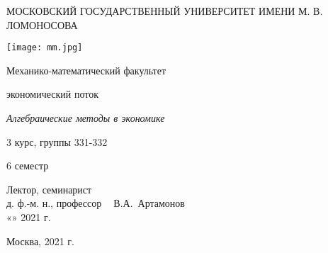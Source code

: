 \begin{titlepage}
  \begin{center}
    \large
 
 	МОСКОВСКИЙ ГОСУДАРСТВЕННЫЙ УНИВЕРСИТЕТ ИМЕНИ М. В. ЛОМОНОСОВА 
    
    \texttt{[image: mm.jpg]} 
     
    Механико-математический факультет
    \vspace{0.25cm} 
      
    экономический поток
    \vspace{0.8cm} 
     
    {\LARGE \textit{Алгебраические методы в экономике}}
    
    \vspace{0.8cm} 
    3 курс, группы 331-332

    \vspace{0.25cm} 
    6 семестр
\end{center}
\vfill
 
\newlength{\ML}
\hfill\begin{minipage}{7cm}
  \begin{flushright}
    Лектор, семинарист $\;\;$\\
    д. ф.-м. н., профессор $\;\;$
    В.А.~Артамонов $\;\;$\\
    «\underline{\hspace{0.7cm}}» \underline{\hspace{2cm}} 2021 г. $\;\;$
  \end{flushright}
\end{minipage}%
\vfill
\bigskip
 
\begin{center}
  Москва, 2021 г.
\end{center}
\clearpage
\end{titlepage}
\newpage